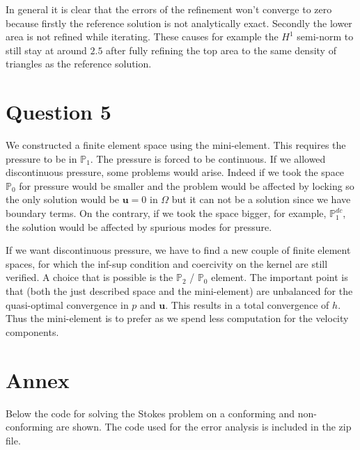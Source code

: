 \documentclass{article}
\begin{document}
In general it is clear that the errors of the refinement won't converge to zero because firstly the reference solution is not analytically exact. Secondly the lower area is not refined while iterating. These causes for example the $H^1$ semi-norm to still stay at around $2.5$ after fully refining the top area to the same density of triangles as the reference solution.

\section*{Question 5}
We constructed a finite element space using the mini-element. This requires the pressure to be in $\mathbb{P}_1$. The pressure is forced to be continuous. If we allowed discontinuous pressure, some problems would arise. Indeed if we took the space $\mathbb{P}_0$ for pressure would be smaller and the problem would be affected by locking so the only solution would be $\mathbf{u}=0$ in $\Omega$ but it can not be a solution since we have boundary terms. On the contrary, if we took the space bigger, for example, $\mathbb{P}_1^{dc}$, the solution would be affected by spurious modes for pressure.

If we want discontinuous pressure, we have to find a new couple of finite element spaces, for which the inf-sup condition and coercivity on the kernel are still verified. A choice that is possible is the $\mathbb{P}_2$ / $\mathbb{P}_0$ element. The important point is that (both the just described space and the mini-element) are unbalanced for the quasi-optimal convergence in $p$ and $\mathbf{u}$. This results in a total convergence of $h$. Thus the mini-element is to prefer as we spend less computation for the velocity components.


\section*{Annex}
Below the code for solving the Stokes problem on a conforming and non-conforming are shown. The code used for the error analysis is included in the zip file.
\end{document}
